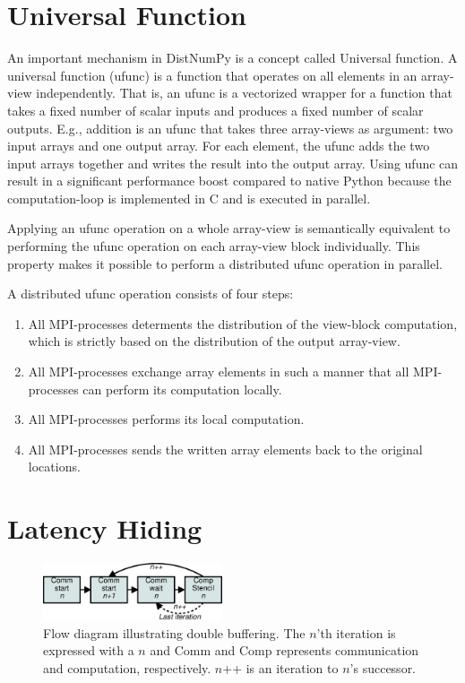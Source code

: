 \documentclass{acm_proc_article-sp}
\begin{document}
\section{Universal Function}
An important mechanism in DistNumPy is a concept called Universal function. A universal function (ufunc) is a function that operates on all elements in an array-view independently. That is, an ufunc is a vectorized wrapper for a function that takes a fixed number of scalar inputs and produces a fixed number of scalar outputs. E.g., addition is an ufunc that takes three array-views as argument: two input arrays and one output array. For each element, the ufunc adds the two input arrays together and writes the result into the output array. Using ufunc can result in a significant performance boost compared to native Python because the computation-loop is implemented in C and is executed in parallel.

Applying an ufunc operation on a whole array-view is semantically equivalent to performing the ufunc operation on each array-view block individually. This property makes it possible to perform a distributed ufunc operation in parallel. 

A distributed ufunc operation consists of four steps:
\begin{enumerate}
\item All MPI-processes determents the distribution of the view-block computation, which is strictly based on the distribution of the output array-view.
\item All MPI-processes exchange array elements in such a manner that all MPI-processes can perform its computation locally. 
\item All MPI-processes performs its local computation.
\item All MPI-processes sends the written array elements back to the original locations.
\end{enumerate}



\section{Latency Hiding}
\begin{figure}
 \centering
 \includegraphics[width=200px]{gfx/double_buffering}
 \caption{Flow diagram illustrating double buffering. The $n$'th iteration is expressed with a $n$ and Comm and Comp represents communication and computation, respectively. $n$++ is an iteration to $n$'s successor.}
 \label{fig:double_buffering}
\end{figure}
\end{document}
